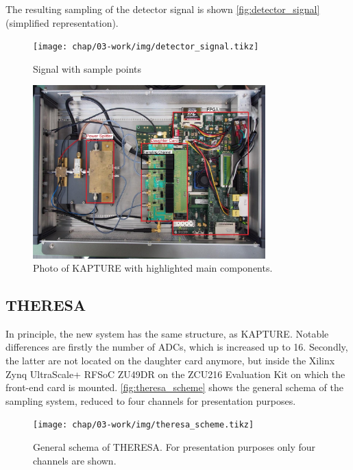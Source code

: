 The resulting sampling of the detector signal is shown \autoref{fig:detector_signal} (simplified representation).
\begin{figure}[H]
	\centering
	\texttt{[image: chap/03-work/img/detector\_signal.tikz]}
	\caption{Signal with sample points}
	\label{fig:detector_signal}
\end{figure}

\begin{figure}[H]
	\centering
	\includegraphics[width = 0.8\textwidth]{chap/03-work/img/kapture_sys.png}
	\caption{Photo of KAPTURE with highlighted main components. \cite[p.~61]{brosi}}
	\label{fig:kapturesys}
\end{figure}

\newpage
\subsection{THERESA}
In principle, the new system has the same structure, as KAPTURE. Notable differences are firstly the number of ADCs, which is increased up to 16. Secondly, the latter are not located on the daughter card anymore, but inside the Xilinx Zynq UltraScale+ RFSoC ZU49DR on the ZCU216 Evaluation Kit on which the front-end card is mounted. \autoref{fig:theresa_scheme} shows the general schema of the sampling system, reduced to four channels for presentation purposes.
\begin{figure}[H]
	\centering
	\texttt{[image: chap/03-work/img/theresa\_scheme.tikz]}
	\caption{General schema of THERESA. For presentation purposes only four channels are shown.}
	\label{fig:theresa_scheme}
\end{figure}

